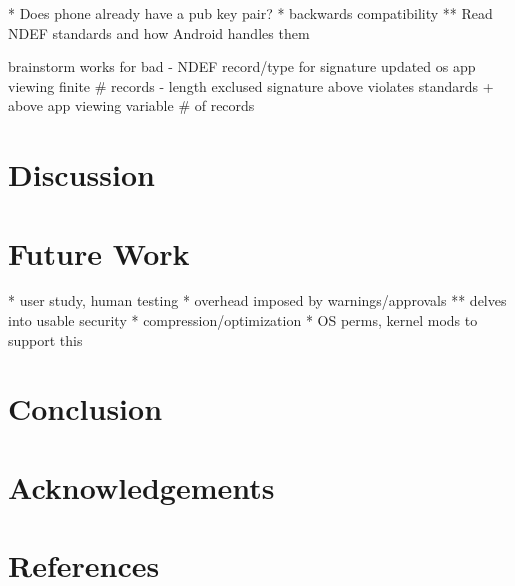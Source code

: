 \documentclass[12pt]{article}
\begin{document}
* Does phone already have a pub key pair?
* backwards compatibility
** Read NDEF standards and how Android handles them

brainstorm                         works for                           bad
- NDEF record/type for signature   updated os
                                   app viewing finite \# records
- length exclused signature        above                               violates standards
  + above                          app viewing variable \# of records   

\section{Discussion}

\section{Future Work}
* user study, human testing
* overhead imposed by warnings/approvals
** delves into usable security
* compression/optimization
* OS perms, kernel mods to support this

\section{Conclusion}

\section{Acknowledgements}

\section{References}
\end{document}
